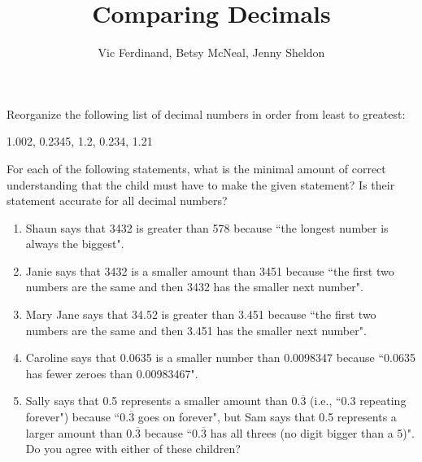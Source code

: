 \documentclass[nooutcomes,noauthor,handout]{ximera}
\title{Comparing Decimals}
\author{Vic Ferdinand, Betsy McNeal, Jenny Sheldon}
\begin{document}
\begin{abstract}\end{abstract}
\maketitle



\begin{problem}
 Reorganize the following list of decimal numbers in order from least to greatest:\\

\begin{center}
    1.002, 0.2345, 1.2,  0.234, 1.21
\end{center}

\end{problem}


\begin{problem}
For each of the following statements, what is the minimal amount of correct understanding that the child must have to make the given statement?  Is their statement accurate for all decimal numbers?
\begin{enumerate}
    

\item Shaun says that 3432 is greater than 578 because ``the longest number is always the biggest".

\vfill




\item Janie says that 3432 is a smaller amount than 3451 because ``the first two numbers are the same and then 3432 has the smaller next number".
\vfill

\item Mary Jane says that 34.52  is greater than 3.451 because ``the first two numbers are the same and then 3.451 has the smaller next number".
\vfill

\item Caroline says that 0.0635  is a smaller number than  0.0098347 because ``0.0635 has fewer zeroes than 0.00983467".
\vfill

\item Sally says that 0.5  represents a smaller amount than 0.$\overline{3}$  (i.e., ``0.3 repeating forever") because ``0.$\overline{3}$ goes on forever", but Sam says that 0.5 represents a larger amount than 0.$\overline{3}$ because ``0.$\overline{3}$ has all threes (no digit bigger than a 5)".  Do you agree with either of these children?
\vfill

\end{enumerate}

\end{problem}
\end{document}
